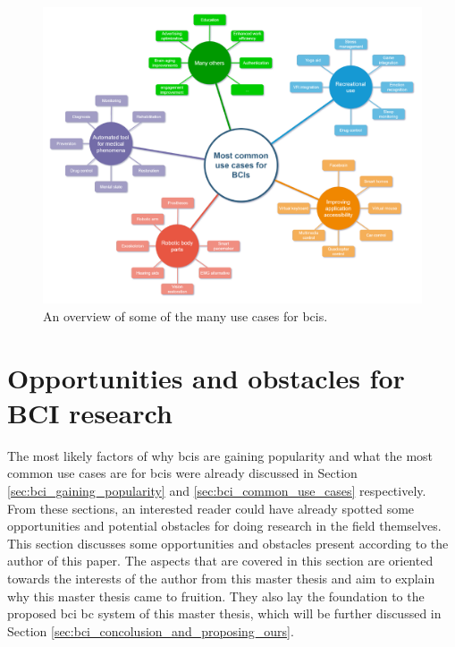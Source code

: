 \begin{figure}[ht]
    \centering
    \includegraphics[width=\linewidth]{../images/introduction/use_cases_overview.pdf}
    \captionsetup{width=0.7\linewidth}
    \captionsetup{justification=centering}
    \caption{An overview of some of the many use cases for \glspl{bci}.} 
    \label{fig:bci_use_cases_diagram}
\end{figure}



\section{Opportunities and obstacles for BCI research}
\label{sec:bci_opportunities_obstacles}

The most likely factors of why \glspl{bci} are gaining popularity and what the most common use cases are for \glspl{bci} were already discussed in Section \ref{sec:bci_gaining_popularity} and \ref{sec:bci_common_use_cases} respectively.
From these sections, an interested reader could have already spotted some opportunities and potential obstacles for doing research in the field themselves.
This section discusses some opportunities and obstacles present according to the author of this paper.
The aspects that are covered in this section are oriented towards the interests of the author from this master thesis and aim to explain why this master thesis came to fruition.
They also lay the foundation to the proposed \gls{bci} \gls{bc} system of this master thesis, which will be further discussed in Section \ref{sec:bci_concolusion_and_proposing_ours}.


